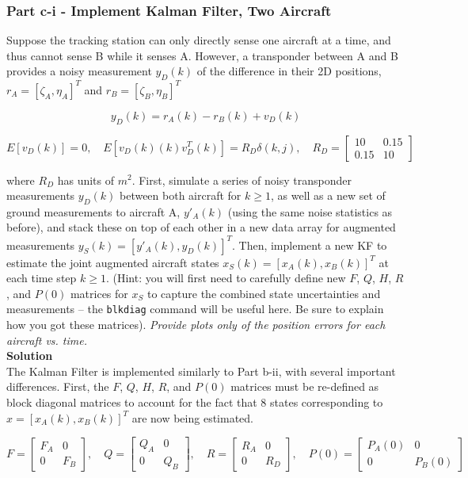 \documentclass[]{article}
\begin{document}
\subsubsection*{Part c-i - Implement Kalman Filter, Two Aircraft}

Suppose the tracking station can only directly sense one aircraft at a time, and thus cannot sense B while it senses A. However, a transponder between A and B provides a noisy measurement $y_D(k)$ of the difference in their 2D positions, $r_A = \left[\zeta_A, \eta_A\right]^T$ and $r_B = \left[\zeta_B, \eta_B\right]^T$

$$
y_D(k) = r_A(k)-r_B(k)+v_D(k)
$$

$$
E[v_D(k)]=0,\quad E[v_D(k)(k)v_D^T(k)] = R_D\delta(k,j),\quad R_D = \left[\begin{array}{cc} 10 & 0.15\\0.15 & 10\end{array}\right]
$$

\noindent where $R_D$ has units of $m^2$. First, simulate a series of noisy transponder measurements $y_D(k)$ between both aircraft for $k\geq1$, as well as a new set of ground measurements to aircraft A, $y'_A(k)$ (using the same noise statistics as before), and stack these on top of each other in a new data array for augmented measurements $y_S(k)=[y'_A(k),y_D(k)]^T$. Then, implement a new KF to estimate the joint augmented aircraft states $x_S(k)=[x_A(k),x_B(k)]^T$ at each time step $k\geq1$. (Hint: you will first need to carefully define new $F$, $Q$, $H$, $R$, and $P(0)$ matrices for $x_S$ to capture the combined state uncertainties and measurements – the \texttt{blkdiag} command will be useful here. Be sure to explain how you got these matrices). \textit{Provide plots only of the position errors for each aircraft vs. time.}\\

\noindent\textbf{Solution}\\
\noindent The Kalman Filter is implemented similarly to Part b-ii, with several important differences. First, the $F$, $Q$, $H$, $R$, and $P(0)$ matrices must be re-defined as block diagonal matrices to account for the fact that 8 states corresponding to $\hat{x}=[x_A(k),x_B(k)]^T$ are now being estimated. 

\begin{equation}
	F = \left[\begin{array}{cc}F_A & 0\\ 0 & F_B\end{array}\right],\quad
	Q = \left[\begin{array}{cc}Q_A & 0\\ 0 & Q_B\end{array}\right],\quad
	R = \left[\begin{array}{cc}R_A & 0\\ 0 & R_D\end{array}\right],\quad
	P(0) = \left[\begin{array}{cc}P_A(0) & 0\\ 0 & P_B(0)\end{array}\right]
	\label{eq:KF_ci_1}
\end{equation}
\end{document}
